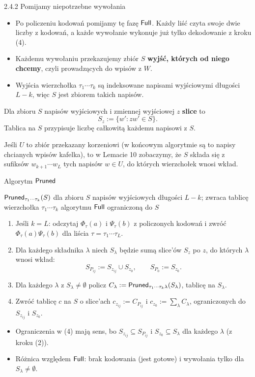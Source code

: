 \begin{frame}{2.4.2 Pomijamy niepotrzebne wywołania}
  \begin{itemize}
    \item Po policzeniu kodowań pomijamy tę fazę $\mathsf{Full}$. Każdy liść czyta swoje dwie liczby z kodowań,
      a każde wywołanie wykonuje już tylko dekodowanie z kroku (4).
    \item Każdemu wywołaniu przekazujemy zbiór $S$ \textbf{wyjść, których od niego chcemy}, czyli prowadzących do wpisów z $W$.
    \item Wyjścia wierzchołka $\tau_1\cdots\tau_k$ są indeksowane napisami wyjściowymi długości $L-k$, więc $S$ jest zbiorem takich napisów.
  \end{itemize}
  \pause
  \begin{definicja}
    Dla zbioru $S$ napisów wyjściowych i zmiennej wyjściowej $z$ \textbf{slice} to
    \[S_z:=\{w' : zw'\in S\}.\]
    Tablica na $S$ przypisuje liczbę całkowitą każdemu napisowi z $S$.
  \end{definicja}
  \pause
  Jeśli $U$ to zbiór przekazany korzeniowi (w końcowym algorytmie są to napisy chcianych wpisów kafelka), to w Lemacie 10 zobaczymy, że $S$
  składa się z sufiksów $w_{k+1}\cdots w_L$ tych napisów $w\in U$, do których wierzchołek wnosi wkład.
\end{frame}

\begin{frame}{Algorytm $\mathsf{Pruned}$}
  \begin{block}{$\mathsf{Pruned}_{\tau_1\cdots\tau_k}(S)$ dla zbioru $S$ napisów wyjściowych długości $L-k$; zwraca tablicę wierzchołka $\tau_1\cdots\tau_k$ algorytmu $\mathsf{Full}$ ograniczoną do $S$}
    \begin{enumerate}
      \item Jeśli $k=L$: odczytaj $\Phi_\tau(a)$ i $\Psi_\tau(b)$ z policzonych kodowań i zwróć $\Phi_\tau(a)\Psi_\tau(b)$ dla liścia $\tau=\tau_1\cdots\tau_L$.
      \item Dla każdego składnika $\lambda$ niech $S_\lambda$ będzie sumą slice'ów $S_z$ po $z$, do których $\lambda$ wnosi wkład:
        \[S_{P_{ij}}:=S_{z_{ij}}\cup S_{z_0},\qquad S_{P_0}:=S_{z_0}.\]
      \item Dla każdego $\lambda$ z $S_\lambda\neq\emptyset$ policz $C_\lambda:=\mathsf{Pruned}_{\tau_1\cdots\tau_k\lambda}(S_\lambda)$, tablicę na $S_\lambda$.
      \item Zwróć tablicę $c$ na $S$ o slice'ach $c_{z_{ij}}:=C_{P_{ij}}$ i $c_{z_0}:=\sum_\lambda C_\lambda$,
        ograniczonych do $S_{z_{ij}}$ i $S_{z_0}$.
    \end{enumerate}
  \end{block}
  \pause
  \begin{itemize}
    \item Ograniczenia w (4) mają sens, bo $S_{z_{ij}}\subseteq S_{P_{ij}}$ i $S_{z_0}\subseteq S_\lambda$ dla każdego $\lambda$ (z kroku (2)).
    \item Różnica względem $\mathsf{Full}$: brak kodowania (jest gotowe) i wywołania tylko dla $S_\lambda\ne\emptyset$.
  \end{itemize}
\end{frame}

